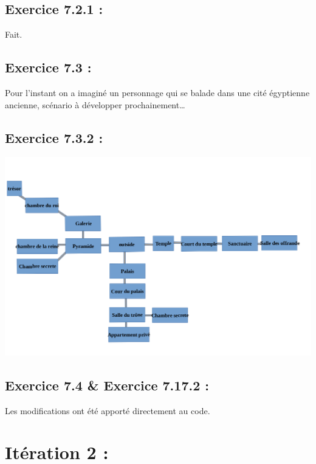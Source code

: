 \documentclass[french,10pt,a4paper]{report}
\begin{document}
\subsection{\textcolor{bb}{Exercice 7.2.1 :}}
Fait.

\subsection{\textcolor{bb}{Exercice 7.3 :}}
Pour l’instant on a imaginé un personnage qui  se balade dans une cité égyptienne ancienne, scénario  à développer prochainement…

\subsection{\textcolor{bb}{Exercice 7.3.2 :}}
\begin{center}
	\includegraphics[scale=0.3]{captures/it1_2.png}
\end{center}

\subsection{\textcolor{bb}{Exercice 7.4 \& Exercice 7.17.2 :}}
Les modifications ont été apporté directement au code.


\section{\textcolor{rr}{Itération 2 :}}
\end{document}
